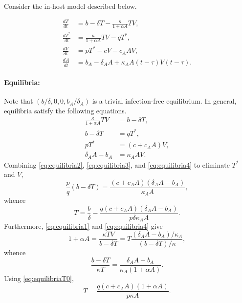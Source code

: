 \documentclass[11pt]{article}
\numberwithin{equation}{subsection}
\begin{document}
    Consider the in-host model described below.

    \begin{align}
        \frac{dT}{dt} &= b -  \delta T - \frac{\kappa}{1 + \alpha A} TV, \\
        \frac{dT^*}{dt} &= \frac{\kappa}{1 + \alpha A} TV - qT^*, \\
        \frac{dV}{dt} &= pT^* - cV - c_A AV, \\
        \frac{dA}{dt} &= b_A -  \delta_A A + \kappa_A A(t - \tau)V(t - \tau).
    \end{align}

    \paragraph{Equilibria:} Note that $(b / \delta, 0, 0, b_A / \delta_A)$ is
    a trivial infection-free equilibrium. In general, equilibria satisfy the
    following equations. \begin{align}
        \frac{\kappa}{1 + \alpha A} TV &= b - \delta T, \label{eq:equilibria1} \\
        b - \delta T &= q T^*, \label{eq:equilibria2} \\
        pT^* &= (c + c_A A)V, \label{eq:equilibria3} \\
        \delta_A A - b_A &= \kappa_A AV. \label{eq:equilibria4}
    \end{align}
    Combining \ref{eq:equilibria2}, \ref{eq:equilibria3}, and
    \ref{eq:equilibria4} to eliminate $T^*$ and $V$, \begin{equation}
        \frac{p}{q}(b - \delta T) = \frac{(c + c_A A)(\delta_A A - b_A)}{\kappa_A A},
            \label{eq:equilibriaT0}
    \end{equation}
    whence \begin{equation}
        T = \frac{b}{\delta} - \frac{q(c + c_A A)(\delta_A A - b_A)}{p \delta \kappa_A A}.
            \label{eq:equilibriaT1}
    \end{equation}
    Furthermore, \ref{eq:equilibria1} and \ref{eq:equilibria4} give \[
        1 + \alpha A = \frac{\kappa TV}{b - \delta T} = T \frac{(\delta_A A - b_A) / \kappa_A}{(b - \delta T) / \kappa},
    \] whence \[
        \frac{b - \delta T}{\kappa T} = \frac{\delta_A A - b_A}{\kappa_A (1 + \alpha A)}.
    \] Using \ref{eq:equilibriaT0}, \begin{equation}
        T  = \frac{q(c + c_A A)(1 + \alpha A)}{p\kappa A}.
            \label{eq:equilibriaT2}
    \end{equation}
\end{document}

